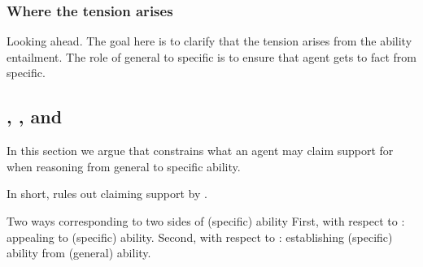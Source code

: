 \subsubsection{Where the tension arises}
\label{sec:where-tension-arises}

\begin{note}
  {
    \color{red}
    Looking ahead.
  }
  The goal here is to clarify that the tension arises from the ability entailment.
  The role of general to specific is to ensure that agent gets to fact from specific.
\end{note}


\subsection{\ESU{}, \gsi{}, and }
\label{sec:first-conditional}

\begin{note}[Summary]
  In this section we argue that \ESU{} constrains what an agent may claim support for when reasoning from general to specific ability.

  In short, \ESU{} rules out claiming support by \adB{}.
\end{note}

\begin{note}
  Two ways corresponding to two sides of (specific) ability
  First, with respect to : appealing to (specific) ability.
  Second, with respect to \gsi{}: establishing (specific) ability from (general) ability.
\end{note}

